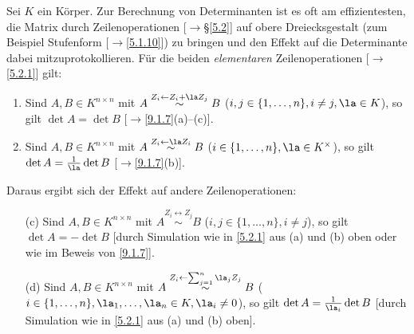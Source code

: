 \documentclass[../../main.tex]{subfiles}
\begin{document}
\begin{bem}\label{9.1.12}
Sei $K$ ein Körper. Zur Berechnung von Determinanten ist es oft am effizientesten, die Matrix durch Zeilenoperationen [$\to$§\ref{5.2}] auf obere Dreiecksgestalt (zum Beispiel Stufenform [$\to$\ref{5.1.10}]) zu bringen und den Effekt auf die Determinante dabei mitzuprotokollieren. Für die beiden \emph{elementaren} Zeilenoperationen [$\to$\ref{5.2.1}] gilt:
\begin{enumerate}[\normalfont(a)]
\item Sind $A,B\in K^{n\times n}$ mit $A\overset{Z_i\leftarrow Z_i+\la Z_j}\sim B$ ($i,j\in\{1,\dots,n\},i\ne j,\la\in K$), so gilt $\det A=\det B$ [$\to$\ref{9.1.7}(a)--(c)].
\item Sind $A,B\in K^{n\times n}$ mit $A\overset{Z_i\leftarrow\la Z_i}\sim B$ ($i\in\{1,\dots,n\},\la\in K^\times$), so gilt $\det A=\frac1\la\det B$ [$\to$\ref{9.1.7}(b)].
\end{enumerate}
Daraus ergibt sich der Effekt auf andere Zeilenoperationen:
\begin{enumerate}[\normalfont(a)]
\item[(c)] Sind $A,B\in K^{n\times n}$ mit $A\overset{Z_i\leftrightarrow Z_j}\sim B$ ($i,j\in\{1,\dots,n\},i\ne j$), so gilt $\det A=-\det B$ [durch Simulation wie in \ref{5.2.1} aus (a) und (b)
oben oder wie im Beweis von \ref{9.1.7}].
\item[(d)] Sind $A,B\in K^{n\times n}$ mit $A\overset{Z_i\leftarrow\sum_{j=1}^n\la_jZ_j}\sim B$ ($i\in\{1,\dots,n\},\la_1,\dots,\la_n\in K,\la_i\ne0$), so gilt $\det A=\frac1{\la_i}\det B$ [durch Simulation wie in \ref{5.2.1} aus (a) und (b) oben].
\end{enumerate}
\end{bem}
\end{document}
